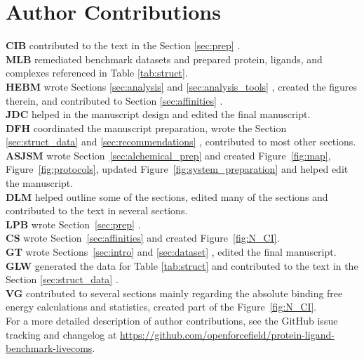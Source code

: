 \documentclass[9pt,bestpractices,pubversion]{livecoms}
\newcommand{\githubrepository}{\href{https://github.com/openforcefield/protein-ligand-benchmark-livecoms}{https://github.com/openforcefield/protein-ligand-benchmark-livecoms}}  %
\begin{document}
\section{Author Contributions}
%
  \textbf{CIB} contributed to the text in the Section \ref{sec:prep} .\\
   \textbf{MLB} remediated benchmark datasets and prepared protein, ligands, and complexes referenced in Table \ref{tab:struct}.\\
  \textbf{HEBM} wrote Sections \ref{sec:analysis}  and \ref{sec:analysis_tools} , created the figures therein, and contributed to Section \ref{sec:affinities} .\\
  \textbf{JDC} helped in the manuscript design and edited the final manuscript.\\
  \textbf{DFH} coordinated the manuscript preparation, wrote the Section \ref{sec:struct_data}   and \ref{sec:recommendations} , contributed to most other sections.\\
  \textbf{ASJSM} wrote Section~\ref{sec:alchemical_prep}  and created Figure~\ref{fig:map}, Figure~\ref{fig:protocols}, updated Figure~\ref{fig:system_preparation} and helped edit the manuscript. \\
  \textbf{DLM} helped outline some of the sections, edited many of the sections and contributed to the text in several sections. \\
  \textbf{LPB} wrote Section~\ref{sec:prep} .\\
  \textbf{CS} wrote Section~\ref{sec:affinities}  and created Figure~\ref{fig:N_CI}.\\
  \textbf{GT} wrote Sections~\ref{sec:intro}  and \ref{sec:dataset} , edited the final manuscript.\\
  \textbf{GLW} generated the data for Table \ref{tab:struct} and contributed to the text in the Section \ref{sec:struct_data}  .\\
  \textbf{VG} contributed to several sections mainly regarding the absolute binding free energy calculations and statistics, created part of the Figure~\ref{fig:N_CI}.\\
For a more detailed description of author contributions,
see the GitHub issue tracking and changelog at \githubrepository.
\end{document}
